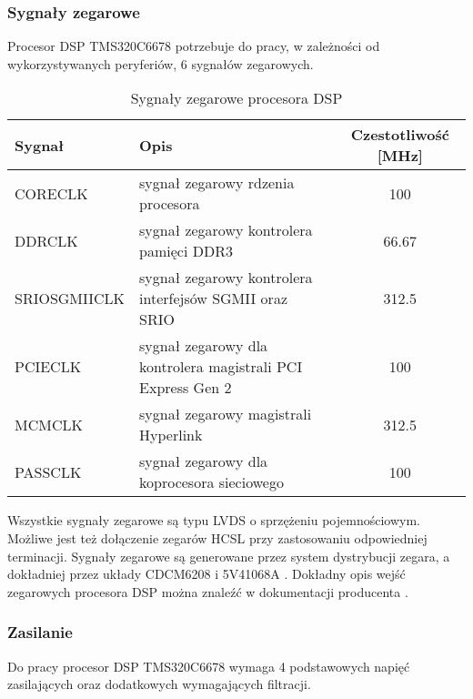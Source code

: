 \subsubsection{Sygnały zegarowe}
Procesor DSP TMS320C6678 potrzebuje do pracy, w zależności od wykorzystywanych peryferiów, 6 sygnałów zegarowych.
\begin{table}[h]
\centering
	\caption{Sygnały zegarowe procesora DSP}
    \begin{tabular}{p{3cm}  p{7.5cm}  c}
	\toprule
    \textbf{Sygnał} & \textbf{Opis} & \textbf{Czestotliwość [MHz]}\\
    \midrule
    CORECLK & 		sygnał zegarowy rdzenia procesora & 											100\\
    DDRCLK & 		sygnał zegarowy kontrolera pamięci DDR3 & 										66.67 \\
    SRIOSGMIICLK & 	sygnał zegarowy kontrolera interfejsów SGMII oraz SRIO & 							312.5\\
    PCIECLK & 		sygnał zegarowy dla kontrolera magistrali PCI Express Gen 2 & 							100\\
    MCMCLK & 		sygnał zegarowy magistrali Hyperlink &											312.5\\
    PASSCLK & 		sygnał zegarowy dla koprocesora sieciowego & 									100\\
	\toprule
    \end{tabular}

	\label{tbl:dsp_clocks}
\end{table}

Wszystkie sygnały zegarowe są typu LVDS o sprzężeniu pojemnościowym. Możliwe jest też dołączenie zegarów HCSL przy zastosowaniu odpowiedniej terminacji. Sygnały zegarowe są generowane przez system dystrybucji zegara, a dokładniej przez układy CDCM6208 \cite{CDCM6208} i 5V41068A \cite{5V41068A}. Dokładny opis wejść zegarowych procesora DSP można znaleźć w dokumentacji producenta \cite{DSP:CLOCK}.
\subsubsection{Zasilanie}
Do pracy procesor DSP TMS320C6678 wymaga 4 podstawowych napięć zasilających oraz dodatkowych wymagających filtracji.

